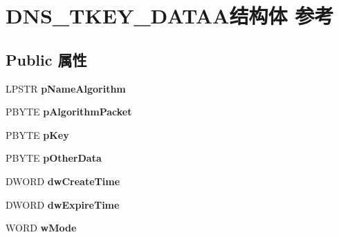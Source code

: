 \hypertarget{struct_d_n_s___t_k_e_y___d_a_t_a_a}{}\section{D\+N\+S\+\_\+\+T\+K\+E\+Y\+\_\+\+D\+A\+T\+A\+A结构体 参考}
\label{struct_d_n_s___t_k_e_y___d_a_t_a_a}
\subsection*{Public 属性}
\begin{DoxyCompactItemize}
\item 
\mbox{\label{struct_d_n_s___t_k_e_y___d_a_t_a_a_a01f522b151c1e1894bf10f0b3d97e5ae}} 
L\+P\+S\+TR {\bfseries p\+Name\+Algorithm}
\item 
\mbox{\label{struct_d_n_s___t_k_e_y___d_a_t_a_a_a51d8d45e8f81365740b0f58903fdab9f}} 
P\+B\+Y\+TE {\bfseries p\+Algorithm\+Packet}
\item 
\mbox{\label{struct_d_n_s___t_k_e_y___d_a_t_a_a_a93f4c07fe797c935600c35191b47f205}} 
P\+B\+Y\+TE {\bfseries p\+Key}
\item 
\mbox{\label{struct_d_n_s___t_k_e_y___d_a_t_a_a_abf7934f65b8e9531ec05da272ab94958}} 
P\+B\+Y\+TE {\bfseries p\+Other\+Data}
\item 
\mbox{\label{struct_d_n_s___t_k_e_y___d_a_t_a_a_ac272e74035c6deadf071c6586a06e290}} 
D\+W\+O\+RD {\bfseries dw\+Create\+Time}
\item 
\mbox{\label{struct_d_n_s___t_k_e_y___d_a_t_a_a_a7eb5ae2770f6d1f7d8ff74e6beeae816}} 
D\+W\+O\+RD {\bfseries dw\+Expire\+Time}
\item 
\mbox{\label{struct_d_n_s___t_k_e_y___d_a_t_a_a_a768cd7f7cb7fadd174959c29d5b423ed}} 
W\+O\+RD {\bfseries w\+Mode}
\item 
\mbox{\label{struct_d_n_s___t_k_e_y___d_a_t_a_a_a4f667f85e0f7650d3029778c99cca3b9}} 

\end{DoxyCompactItemize}
